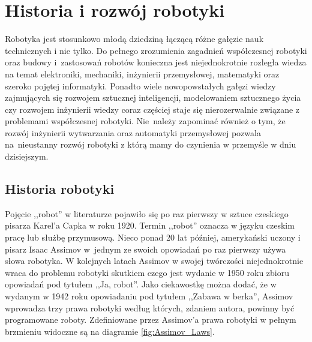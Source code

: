 \chapter{Historia i rozwój robotyki}
\label{ch:history}
Robotyka jest stosunkowo młodą dziedziną łączącą różne gałęzie nauk technicznych
i nie tylko. Do pełnego zrozumienia zagadnień współczesnej robotyki oraz budowy
i~zastosowań robotów konieczna jest niejednokrotnie rozległa wiedza na temat
elektroniki, mechaniki, inżynierii przemysłowej, matematyki oraz szeroko pojętej
informatyki. Ponadto wiele nowopowstałych gałęzi wiedzy zajmujących się rozwojem
sztucznej inteligencji, modelowaniem sztucznego życia czy rozwojem inżynierii
wiedzy coraz częściej staje się nierozerwalnie związane z problemami współczesnej
robotyki. Nie~należy zapominać również o tym, że rozwój inżynierii wytwarzania
oraz automatyki przemysłowej pozwala na~nieustanny rozwój robotyki z którą mamy
do czynienia w przemyśle w dniu dzisiejszym.

\section{Historia robotyki}
Pojęcie ,,robot'' w literaturze pojawiło się po raz pierwszy w sztuce czeskiego
pisarza Karel'a Capka w roku 1920. Termin ,,robot'' oznacza w języku czeskim
pracę lub służbę przymusową. Nieco ponad 20 lat później, amerykański uczony i
pisarz Isaac Assimov w~jednym ze swoich opowiadań po raz pierwszy używa słowa
robotyka. W kolejnych latach Assimov w swojej twórczości niejednokrotnie wraca do
problemu robotyki skutkiem czego jest wydanie w 1950 roku zbioru opowiadań pod
tytułem ,,Ja, robot''. Jako ciekawostkę można dodać, że w wydanym w 1942 roku
opowiadaniu pod tytułem ,,Zabawa w berka'', Assimov wprowadza trzy prawa robotyki
według których, zdaniem autora, powinny być programowane roboty\cite{Runaround}.
Zdefiniowane przez Assimov'a prawa robotyki w pełnym brzmieniu widoczne są na
diagramie \ref{fig:Assimov_Laws}.

